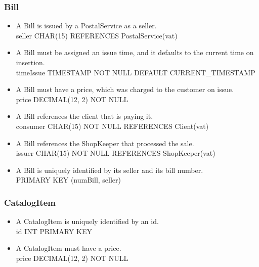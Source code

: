 \documentclass{report}[a4paper]
\theoremstyle{remark}
\begin{document}
\subsubsection{Bill}
\begin{itemize}
    \item A Bill is issued by a PostalService as a seller. \\ seller CHAR(15) REFERENCES PostalService(vat)
    \item A Bill must be assigned an issue time, and it defaults to the current time on insertion. \\ timeIssue TIMESTAMP NOT NULL DEFAULT CURRENT\_TIMESTAMP
    \item A Bill must have a price, which was charged to the customer on issue. \\ price DECIMAL(12, 2) NOT NULL
    \item A Bill references the client that is paying it. \\ consumer CHAR(15) NOT NULL REFERENCES Client(vat)
    \item A Bill references the ShopKeeper that processed the sale. \\ issuer CHAR(15) NOT NULL REFERENCES ShopKeeper(vat)
    \item A Bill is uniquely identified by its seller and its bill number. \\ PRIMARY KEY (numBill, seller)
\end{itemize}
\subsubsection{CatalogItem}
\begin{itemize}
    \item A CatalogItem is uniquely identified by an id. \\ id INT PRIMARY KEY
    \item A CatalogItem must have a price. \\ price DECIMAL(12, 2) NOT NULL
\end{itemize}
\end{document}
